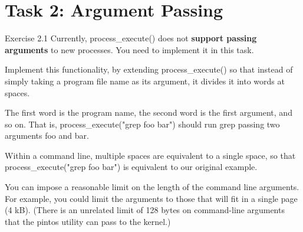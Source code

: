 \documentclass[10pt]{beamer}
\begin{document}
\section{Task 2: Argument Passing}
\begin{frame}[fragile]{Exercise 2.1}
        Currently, process\_execute() does not \textbf{support passing arguments} to new processes. You need to implement it in this task.

Implement this functionality, by extending process\_execute() so that instead of simply taking a program file name as its argument, it divides it into words at spaces.

The first word is the program name, the second word is the first argument, and so on. That is, process\_execute("grep foo bar") should run grep passing two arguments foo and bar.

Within a command line, multiple spaces are equivalent to a single space, so that process\_execute("grep foo bar") is equivalent to our original example.

You can impose a reasonable limit on the length of the command line arguments. For example, you could limit the arguments to those that will fit in a single page (4 kB). (There is an unrelated limit of 128 bytes on command-line arguments that the pintos utility can pass to the kernel.)
\end{frame}
\end{document}

